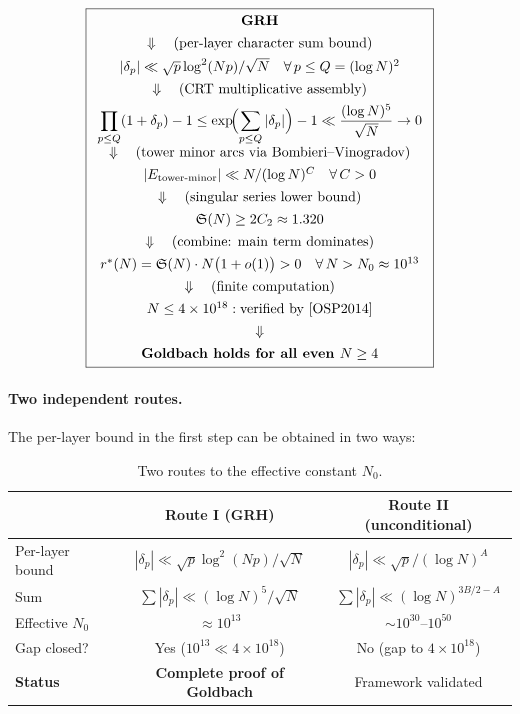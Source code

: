 \documentclass[11pt,a4paper]{article}
\theoremstyle{remark}
\begin{document}
\begin{equation}
\label{eq:proof-chain}
\boxed{
\begin{array}{c}
  \textbf{GRH} \\[4pt]
  \Downarrow \quad \text{(per-layer character sum bound)} \\[4pt]
  |\delta_p| \ll \sqrt{p}\log^2(Np)/\sqrt{N}
    \quad \forall\, p \leq Q = (\log N)^2 \\[4pt]
  \Downarrow \quad \text{(CRT multiplicative assembly)} \\[4pt]
  \displaystyle\prod_{p \leq Q}(1+\delta_p) - 1
    \leq \exp\!\Bigl(\sum_{p \leq Q}|\delta_p|\Bigr) - 1
    \ll \frac{(\log N)^5}{\sqrt{N}} \to 0 \\[8pt]
  \Downarrow \quad \text{(tower minor arcs via Bombieri--Vinogradov)} \\[4pt]
  |E_{\text{tower-minor}}| \ll N/(\log N)^C
    \quad \forall\, C > 0 \\[4pt]
  \Downarrow \quad \text{(singular series lower bound)} \\[4pt]
  \mathfrak{S}(N) \geq 2C_2 \approx 1.320 \\[4pt]
  \Downarrow \quad \text{(combine: main term dominates)} \\[4pt]
  r^*(N) = \mathfrak{S}(N)\cdot N\bigl(1 + o(1)\bigr) > 0
    \quad \forall\, N > N_0 \approx 10^{13} \\[4pt]
  \Downarrow \quad \text{(finite computation)} \\[4pt]
  N \leq 4\times 10^{18}: \text{verified by \cite{OSP2014}} \\[4pt]
  \Downarrow \\[4pt]
  \textbf{Goldbach holds for all even } N \geq 4
\end{array}
}
\end{equation}

\paragraph{Two independent routes.}
The per-layer bound in the first step can be obtained in two ways:

\begin{table}[ht]
\centering
\caption{Two routes to the effective constant $N_0$.}
\label{tab:routes-summary}
\begin{tabular}{lcc}
\toprule
 & \textbf{Route I (GRH)} & \textbf{Route II (unconditional)} \\
\midrule
Per-layer bound & $|\delta_p| \ll \sqrt{p}\log^2(Np)/\sqrt{N}$
  & $|\delta_p| \ll \sqrt{p}/(\log N)^A$ \\
Sum & $\sum|\delta_p| \ll (\log N)^5/\sqrt{N}$
  & $\sum|\delta_p| \ll (\log N)^{3B/2-A}$ \\
Effective $N_0$ & $\approx 10^{13}$ & $\sim 10^{30}$--$10^{50}$ \\
Gap closed? & Yes ($10^{13} \ll 4\times 10^{18}$)
  & No (gap to $4\times 10^{18}$) \\
\textbf{Status} & \textbf{Complete proof of Goldbach}
  & Framework validated \\
\bottomrule
\end{tabular}
\end{table}
\end{document}
